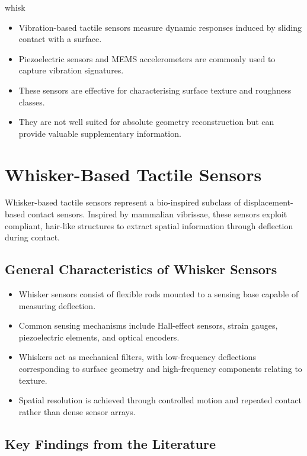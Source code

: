 whisk\documentclass[11pt,a4paper]{article}
\begin{document}
\begin{itemize}
    \item Vibration-based tactile sensors measure dynamic responses induced by sliding contact with a surface.
    \item Piezoelectric sensors and MEMS accelerometers are commonly used to capture vibration signatures.
    \item These sensors are effective for characterising surface texture and roughness classes.
    \item They are not well suited for absolute geometry reconstruction but can provide valuable supplementary information.
\end{itemize}

\section{Whisker-Based Tactile Sensors}

Whisker-based tactile sensors represent a bio-inspired subclass of displacement-based contact sensors. Inspired by mammalian vibrissae, these sensors exploit compliant, hair-like structures to extract spatial information through deflection during contact.

\subsection{General Characteristics of Whisker Sensors}

\begin{itemize}
    \item Whisker sensors consist of flexible rods mounted to a sensing base capable of measuring deflection.
    \item Common sensing mechanisms include Hall-effect sensors, strain gauges, piezoelectric elements, and optical encoders.
    \item Whiskers act as mechanical filters, with low-frequency deflections corresponding to surface geometry and high-frequency components relating to texture.
    \item Spatial resolution is achieved through controlled motion and repeated contact rather than dense sensor arrays.
\end{itemize}

\subsection{Key Findings from the Literature}
\end{document}
